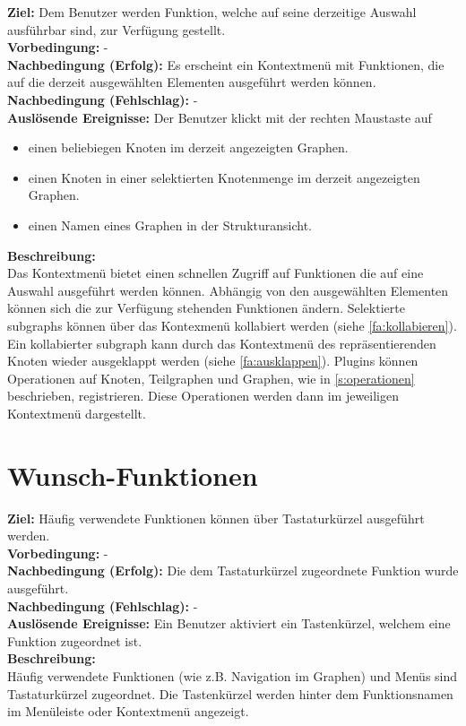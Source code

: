 \label{fa:kontextmenü}
\textbf{Ziel:} Dem Benutzer werden Funktion, welche auf seine derzeitige Auswahl ausführbar sind, zur Verfügung gestellt.\\
\textbf{Vorbedingung:} -\\
\textbf{Nachbedingung (Erfolg):} Es erscheint ein Kontextmenü mit Funktionen, die auf die derzeit ausgewählten Elementen ausgeführt werden können.\\
\textbf{Nachbedingung (Fehlschlag):} -\\
\textbf{Auslösende Ereignisse:} Der Benutzer klickt mit der rechten Maustaste auf
\begin{itemize}[nolistsep]
  \item einen beliebiegen Knoten im derzeit angezeigten Graphen.
  \item einen Knoten in einer selektierten Knotenmenge im derzeit angezeigten Graphen.
  \item einen Namen eines Graphen in der Strukturansicht.
\end{itemize}
\textbf{Beschreibung:}\\
Das Kontextmenü bietet einen schnellen Zugriff auf Funktionen die auf eine Auswahl ausgeführt werden können.
Abhängig von den ausgewählten Elementen können sich die zur Verfügung stehenden Funktionen ändern.
Selektierte \glspl{subgraph} können über das Kontexmenü kollabiert werden (siehe \ref{fa:kollabieren}).
Ein kollabierter \gls{subgraph} kann durch das Kontextmenü des repräsentierenden Knoten wieder ausgeklappt werden (siehe \ref{fa:ausklappen}).
Plugins können Operationen auf Knoten, Teilgraphen und Graphen, wie in \ref{s:operationen} beschrieben, registrieren.
Diese Operationen werden dann im jeweiligen Kontextmenü dargestellt.


\label{fa:speichern}
\label{fa:laden}

\label{fa:joanatyp}
\section{Wunsch-Funktionen}

\label{fa:hotkey}
\textbf{Ziel:} Häufig verwendete Funktionen können über Tastaturkürzel ausgeführt werden.\\
\textbf{Vorbedingung:} -\\
\textbf{Nachbedingung (Erfolg):} Die dem Tastaturkürzel zugeordnete Funktion wurde ausgeführt.\\
\textbf{Nachbedingung (Fehlschlag):} -\\
\textbf{Auslösende Ereignisse:}
Ein Benutzer aktiviert ein Tastenkürzel, welchem eine Funktion zugeordnet ist.\\
\textbf{Beschreibung:}\\
Häufig verwendete Funktionen (wie z.B. Navigation im Graphen) und Menüs sind Tastaturkürzel zugeordnet.
Die Tastenkürzel werden hinter dem Funktionsnamen im Menüleiste oder Kontextmenü angezeigt.

